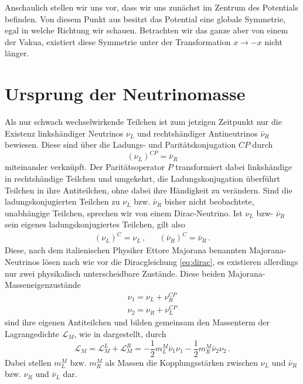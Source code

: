 Anschaulich stellen wir uns vor, dass wir uns zunächst im Zentrum des Potentials befinden.
Von diesem Punkt aus besitzt das Potential eine globale Symmetrie, egal in welche Richtung wir schauen.
Betrachten wir das ganze aber von einem der Vakua, existiert diese Symmetrie unter der Transformation $x \rightarrow -x$ nicht länger.

\section{Ursprung der Neutrinomasse} %
\label{sec:neutrinomasse}

Als nur schwach wechselwirkende Teilchen ist zum jetzigen Zeitpunkt nur die Existenz linkshändiger Neutrinos $\nu_L$ und rechtshändiger Antineutrinos $\bar{\nu}_R$ bewiesen.
Diese sind über die Ladungs- und Paritätskonjugation $C P$ durch 
\begin{equation}
    (\nu_L)^{C P} = \bar{\nu}_R
    \label{eq:cpkonju}
\end{equation}
miteinander verknüpft.
Der Paritätsoperator $P$ transformiert dabei linkshändige in rechtshändige Teilchen und umgekehrt, die Ladungskonjugation überführt Teilchen in ihre Antiteilchen, ohne dabei ihre Händigkeit zu verändern.
Sind die ladungskonjugierten Teilchen zu $\nu_L$ bzw. $\bar{\nu}_R$ bisher nicht beobachtete, unabhängige Teilchen, sprechen wir von einem Dirac-Neutrino.
Ist $\nu_L$ bzw- $\bar{\nu}_R$ sein eigenes ladungskonjugiertes Teilchen, gilt also
\begin{align*}
    (\nu_L)^C = \nu_L \,, && (\bar{\nu}_R)^C = \bar{\nu}_R \,.
\end{align*}
Diese, nach dem italienischen Physiker Ettore Majorana benannten Majorana-Neutrinos lösen nach wie vor die Diracgleichung \eqref{eq:dirac}, es existieren allerdings nur zwei physikalisch unterscheidbare Zustände.
Diese beiden Majorana-Masseneigenzustände
\begin{align*}
    \nu_1 = \nu_L + \nu^{C P}_R \\
    \nu_2 = \nu_R + \nu^{C P}_L
\end{align*}
sind ihre eigenen Antiteilchen und bilden gemeinsam den Massenterm der Lagrangedichte $\mathcal{L}_M$, wie in \cite{kleingrot} dargestellt, durch
\begin{equation}
    \mathcal{L}_M = \mathcal{L}^L_M + \mathcal{L}^R_M = -\frac{1}{2} m^M_L \bar{\nu}_1 \nu_1 - \frac{1}{2} m^M_R \bar{\nu}_2 \nu_2 \,.
    \label{eq:lagrangedichtemajo}
\end{equation}
Dabei stellen $m^M_L$ bzw. $m^M_R$ als Massen die Kopplungsstärken zwischen $\nu_L$ und $\bar{\nu}_R$ bzw. $\nu_R$ und $\bar{\nu}_L$ dar.

